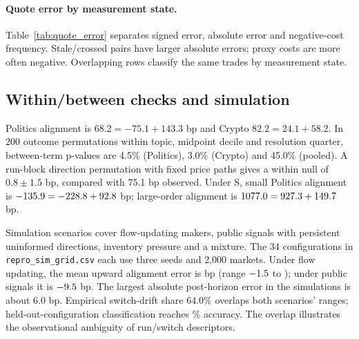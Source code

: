 \documentclass[sigconf,anonymous,nonacm,balance=false]{acmart}
\newcommand{\tabstyle}{\setlength{\tabcolsep}{3pt}}
\begin{document}
\paragraph{Quote error by measurement state.}
Table~\ref{tab:quote_error} separates signed error, absolute error and negative-cost frequency. Stale/crossed pairs have larger absolute errors; proxy costs are more often negative. Overlapping rows classify the same trades by measurement state.
\begin{table}[!tbp]
\centering
\caption{Proxy error on pmxt-matched trades. With $e=m-m^q$, $De$ is signed proxy error and $|e|$ is mean absolute error, in probability bp. Outside is the percentage of proxy midpoints outside the quoted spread. The last column reports negative execution-cost percentages for proxy/quote midpoints; parentheses are event-cluster SEs. Rows overlap.}
\label{tab:quote_error}
\tabstyle

\end{table}

\subsection{Within/between checks and simulation}
\label{app:wb}
Politics alignment is $68.2=-75.1+143.3$ bp and Crypto $82.2=24.1+58.2$. In 200 outcome permutations within topic, midpoint decile and resolution quarter, between-term p-values are 4.5\% (Politics), 3.0\% (Crypto) and 45.0\% (pooled). A run-block direction permutation with fixed price paths gives a within null of $0.8\pm1.5$ bp, compared with 75.1 bp observed. Under S, small Politics alignment is $-135.9=-228.8+92.8$ bp; large-order alignment is $1077.0=927.3+149.7$ bp.

\label{sec:sim}
Simulation scenarios cover flow-updating makers, public signals with persistent uninformed directions, inventory pressure and a mixture. The 34 configurations in \nolinkurl{repro_sim_grid.csv} each use three seeds and 2,000 markets. Under flow updating, the mean upward alignment error is \EdSimMean{} bp (range $-1.5$ to \EdSimMax); under public signals it is $-9.5$ bp. The largest absolute post-horizon error in the simulations is about 6.0 bp. Empirical switch-drift share 64.0\% overlaps both scenarios' ranges; held-out-configuration classification reaches \EdSimAccuracy\% accuracy. The overlap illustrates the observational ambiguity of run/switch descriptors.
\end{document}
